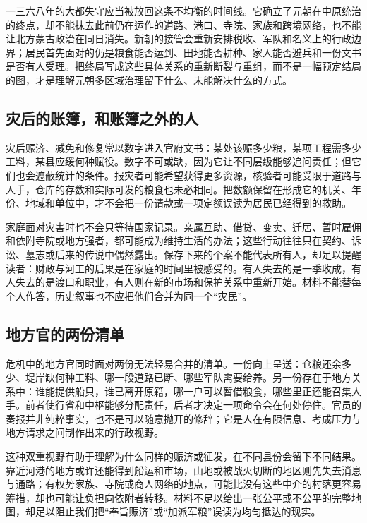 一三六八年的大都失守应当被放回这条不均衡的时间线。它确立了元朝在中原统治的终点，却不能抹去此前仍在运作的道路、港口、寺院、家族和跨境网络，也不能让北方蒙古政治在同日消失。新朝的接管会重新安排税收、军队和名义上的行政边界；居民首先面对的仍是粮食能否运到、田地能否耕种、家人能否避兵和一份文书是否有人受理。把终局写成这些具体关系的重新断裂与重组，而不是一幅预定结局的图，才是理解元朝多区域治理留下什么、未能解决什么的方式。

\subsection{灾后的账簿，和账簿之外的人}

灾后赈济、减免和修复常以数字进入官府文书：某处该赈多少粮，某项工程需多少工料，某县应缓何种赋役。数字不可或缺，因为它让不同层级能够追问责任；但它们也会遮蔽统计的条件。报灾者可能希望获得更多资源，核验者可能受限于道路与人手，仓库的存数和实际可发的粮食也未必相同。把数额保留在形成它的机关、年份、地域和单位中，才不会把一份请款或一项定额误读为居民已经得到的救助。

家庭面对灾害时也不会只等待国家记录。亲属互助、借贷、变卖、迁居、暂时雇佣和依附寺院或地方强者，都可能成为维持生活的办法；这些行动往往只在契约、诉讼、墓志或后来的传说中偶然露出。保存下来的个案不能代表所有人，却足以提醒读者：财政与河工的后果是在家庭的时间里被感受的。有人失去的是一季收成，有人失去的是渡口和职业，有人则在新的市场和保护关系中重新开始。材料不能替每个人作答，历史叙事也不应把他们合并为同一个“灾民”。

\subsection{地方官的两份清单}

危机中的地方官同时面对两份无法轻易合并的清单。一份向上呈送：仓粮还余多少、堤岸缺何种工料、哪一段道路已断、哪些军队需要给养。另一份存在于地方关系中：谁能提供船只，谁已离开原籍，哪一户可以暂借粮食，哪些里正还能召集人手。前者使行省和中枢能够分配责任，后者才决定一项命令会在何处停住。官员的奏报并非纯粹事实，也不是可以随意抛开的修辞；它是人在有限信息、考成压力与地方请求之间制作出来的行政视野。

这种双重视野有助于理解为什么同样的赈济或征发，在不同县份会留下不同结果。靠近河港的地方或许还能得到船运和市场，山地或被战火切断的地区则先失去消息与通路；有权势家族、寺院或商人网络的地点，可能比没有这些中介的村落更容易筹措，却也可能让负担向依附者转移。材料不足以给出一张公平或不公平的完整地图，却足以阻止我们把“奉旨赈济”或“加派军粮”误读为均匀抵达的现实。

